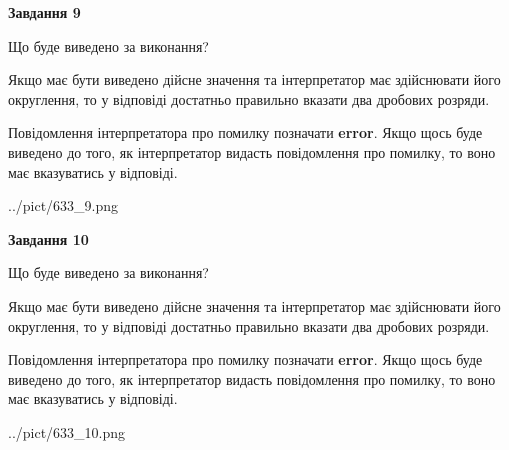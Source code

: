 \documentclass[12pt, ukrainian]{article}
\begin{document}
{\begin {Large}
{\begin {center}\textbf{Завдання 9}\end {center}}\par
Що буде виведено за виконання? \par

Якщо має бути виведено дійсне значення та інтерпретатор має здійснювати його округлення, 
то у відповіді достатньо правильно вказати два дробових розряди.

Повідомлення інтерпретатора про помилку позначати \textbf{error}.
Якщо щось буде виведено до того, як інтерпретатор видасть повідомлення про помилку, 
то воно має вказуватись у відповіді. \par

\begin{center}
	{../pict/633_9.png}
\end{center}
\newpage

{\begin {center}\textbf{Завдання 10}\end {center}}\par
Що буде виведено за виконання? \par

Якщо має бути виведено дійсне значення та інтерпретатор має здійснювати його округлення, 
то у відповіді достатньо правильно вказати два дробових розряди.

Повідомлення інтерпретатора про помилку позначати \textbf{error}.
Якщо щось буде виведено до того, як інтерпретатор видасть повідомлення про помилку, 
то воно має вказуватись у відповіді. \par

\begin{center}
	{../pict/633_10.png}
\end{center}
\newpage

\end {Large}}
\end{document}
